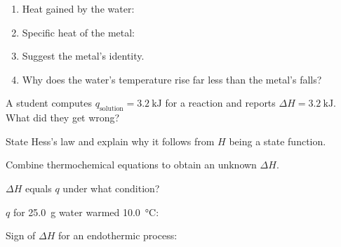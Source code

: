 \documentclass{apchem-notes}
\begin{document}
\begin{enumerate}[leftmargin=*,itemsep=0.4em]
  \item Heat gained by the water: \workspace[1.8cm]
  \item Specific heat of the metal: \workspace[2.2cm]
  \item Suggest the metal's identity.
  \item Why does the water's temperature rise far less than the metal's
        falls? 
\end{enumerate}

\begin{exitticket}
A student computes $q_{\text{solution}} = \SI{+3.2}{\kilo\joule}$ for a
reaction and reports $\Delta H = \SI{+3.2}{\kilo\joule}$. What did they get
wrong? 
\end{exitticket}


\begin{objectives}
  \item State Hess's law and explain why it follows from $H$ being a state
        function.
  \item Combine thermochemical equations to obtain an unknown $\Delta H$.
\end{objectives}


\begin{warmup}[3]
  \item $\Delta H$ equals $q$ under what condition?
  \item $q$ for \SI{25.0}{\gram} water warmed \SI{10.0}{\celsius}:
  \item Sign of $\Delta H$ for an endothermic process:
\end{warmup}
\end{document}
